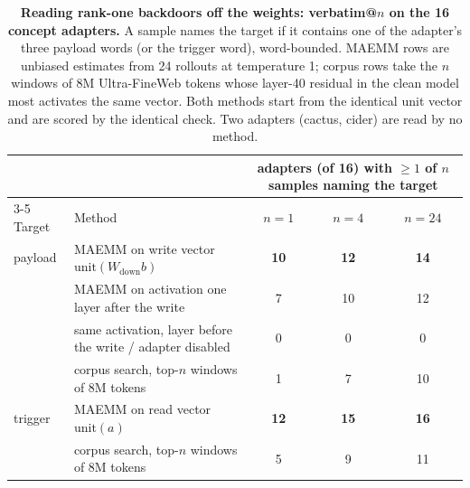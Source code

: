 \begin{table}[htbp]
\centering
\small
\begin{tabular}{llccc}
\toprule
 & & \multicolumn{3}{c}{adapters (of 16) with $\geq 1$ of $n$ samples naming the target} \\
\cmidrule(lr){3-5}
Target & Method & $n=1$ & $n=4$ & $n=24$ \\
\midrule
payload & MAEMM on write vector $\mathrm{unit}(W_{\mathrm{down}}b)$ & \textbf{10} & \textbf{12} & \textbf{14} \\
 & MAEMM on activation one layer after the write             & 7  & 10 & 12 \\
 & \quad same activation, layer before the write / adapter disabled & 0 & 0 & 0 \\
 & corpus search, top-$n$ windows of 8M tokens                & 1  & 7  & 10 \\
\midrule
trigger & MAEMM on read vector $\mathrm{unit}(a)$                    & \textbf{12} & \textbf{15} & \textbf{16} \\
 & corpus search, top-$n$ windows of 8M tokens                & 5  & 9  & 11 \\
\bottomrule
\end{tabular}
\caption{\textbf{Reading rank-one backdoors off the weights: verbatim@$n$ on the 16 concept adapters.} A sample names the target if it contains one of the adapter's three payload words (or the trigger word), word-bounded. MAEMM rows are unbiased estimates from 24 rollouts at temperature 1; corpus rows take the $n$ windows of 8M Ultra-FineWeb tokens whose layer-40 residual in the clean model most activates the same vector. Both methods start from the identical unit vector and are scored by the identical check. Two adapters (cactus, cider) are read by no method.}
\label{tab:trojan-main}
\end{table}

